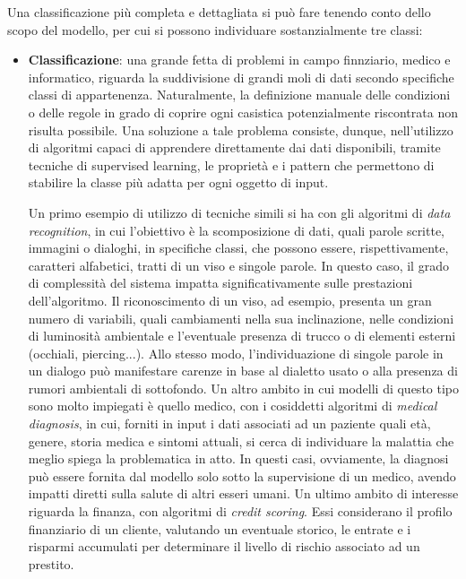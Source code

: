 Una classificazione più completa e dettagliata si può fare tenendo conto dello scopo del modello, per cui si possono individuare sostanzialmente tre classi:

    \begin{itemize}

        \item \textbf{Classificazione}: una grande fetta di problemi in campo finnziario, medico e informatico, riguarda la suddivisione di grandi moli di dati secondo specifiche classi di appartenenza. Naturalmente, la definizione manuale delle condizioni o delle regole in grado di coprire ogni casistica potenzialmente riscontrata non risulta possibile. Una soluzione a tale problema consiste, dunque, nell'utilizzo di algoritmi capaci di apprendere direttamente dai dati disponibili, tramite tecniche di supervised learning, le proprietà e i pattern che permettono di stabilire la classe più adatta per ogni oggetto di input. 
        
        Un primo esempio di utilizzo di tecniche simili si ha con gli algoritmi di \emph{data recognition}, in cui l'obiettivo è la scomposizione di dati, quali parole scritte, immagini o dialoghi, in specifiche classi, che possono essere, rispettivamente, caratteri alfabetici, tratti di un viso e singole parole. In questo caso, il grado di complessità del sistema impatta significativamente sulle prestazioni dell'algoritmo. Il riconoscimento di un viso, ad esempio, presenta un gran numero di variabili, quali cambiamenti nella sua inclinazione, nelle condizioni di luminosità ambientale e l'eventuale presenza di trucco o di elementi esterni (occhiali, piercing...). Allo stesso modo, l'individuazione di singole parole in un dialogo può manifestare carenze in base al dialetto usato o alla presenza di rumori ambientali di sottofondo. Un altro ambito in cui modelli di questo tipo sono molto impiegati è quello medico, con i cosiddetti algoritmi di \emph{medical diagnosis}, in cui, forniti in input i dati associati ad un paziente quali età, genere, storia medica e sintomi attuali, si cerca di individuare la malattia che meglio spiega la problematica in atto. In questi casi, ovviamente, la diagnosi può essere fornita dal modello solo sotto la supervisione di un medico, avendo impatti diretti sulla salute di altri esseri umani. Un ultimo ambito di interesse riguarda la finanza, con algoritmi di \emph{credit scoring}. Essi considerano il profilo finanziario di un cliente, valutando un eventuale storico, le entrate e i risparmi accumulati per determinare il livello di rischio associato ad un prestito. 
        

\end{itemize}

